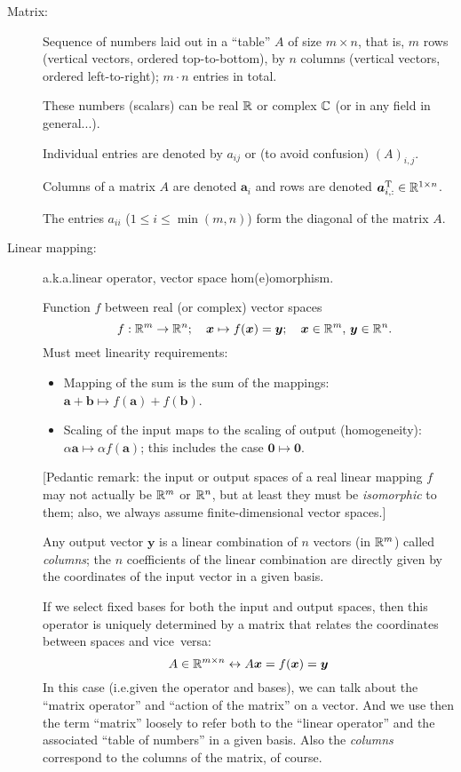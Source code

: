 \documentclass[
  12pt,
  paper=a4,
]{scrartcl} %
\begin{document}
\begin{description}
\item[Matrix:] Sequence of numbers laid out in a ``table'' $A$ of size ${m\times n}$, that is, $m$ rows (vertical vectors, ordered top-to-bottom), by $n$ columns (vertical vectors, ordered left-to-right); $m\cdot n$ entries in total.

These numbers (scalars) can be real $\mathbb R$ or complex $\mathbb C$ (or in any field in general...).

Individual entries are denoted by $a_{ij}$ or (to avoid confusion) $(A)_{i,j}$.

Columns of a matrix $A$ are denoted $\bm a_i$ and rows are denoted $ \bm a_{i,:}^{\mathrm{T}} \in \mathbb R^{1\times n}$.

The entries $a_{ii}$ ($1 \le i\le \min(m,n)$) form the diagonal of the matrix $A$.

\item[Linear mapping:] a.k.a.\@ linear operator, vector space hom(e)omorphism.

Function $f$ between real (or complex) vector spaces \[\quad f: \mathbb R^m \to \mathbb R^n ;\quad \bm x \mapsto f(\bm x) = \bm y; \quad \bm x \in \mathbb R^m, \, \bm y \in \mathbb R^n .\]
Must meet linearity requirements:
\begin{itemize}
    \item Mapping of the sum is the sum of the mappings: $\bm a + \bm b \mapsto f(\bm a) + f(\bm b)$.
    \item Scaling of the input maps to the scaling of output (homogeneity): $\alpha\bm a \mapsto \alpha f(\bm a)$; this includes the case $\bm 0\mapsto \bm 0$.
\end{itemize}

[Pedantic remark: the input or output spaces of a real linear mapping $f$ may not actually be $\mathbb R^m$ or $\mathbb R^n$, but at least they must be \emph{isomorphic} to them; also, we always assume finite-dimensional vector spaces.]

Any output vector $\bm y$ is a linear combination of $n$ vectors (in $\mathbb R^m$) called \emph{columns}; the $n$ coefficients of the linear combination are directly given by the coordinates of the input vector in a given basis.

If we select fixed bases for both the input and output spaces, then this operator is uniquely determined by a matrix that relates the coordinates between spaces and vice~versa: \[
    A \in\mathbb R^{m\times n} \leftrightarrow  A\bm x = f(\bm x) = \bm y
\]
In this case (i.e.\@ given the operator and bases), we can talk about the ``matrix operator'' and ``action of the matrix'' on a vector. And we use then the term ``matrix'' loosely to refer both to the ``linear operator'' and the associated ``table of numbers'' in a given basis. Also the \emph{columns} correspond to the columns of the matrix, of course.


\end{description}
\end{document}
